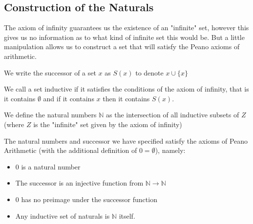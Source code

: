 \documentclass[]{article}
\begin{document}
\subsection{Construction of the Naturals}

	The axiom of infinity guarantees us the existence of an "infinite" set, however this gives us no information as to what kind of infinite set this would be. But a little manipulation allows us to construct a set that will satisfy the Peano axioms of arithmetic.

	\begin{defi} [Successor]
		We write the successor of a set $x$ as $S(x)$ to denote $x \cup \{x\}$
	\end{defi}
	
	\begin{defi} 
		We call a set inductive if it satisfies the conditions of the axiom of infinity, that is it contains $\emptyset$ and if it contains $x$ then it contains $S(x)$. 
	\end{defi}

	\begin{defi} 
			We define the natural numbers $\mathbb{N}$ as the intersection of all inductive subsets of $Z$ (where $Z$ is the "infinite" set given by the axiom of infinity)
	\end{defi}

	\begin{thm}  \label{thm:peano}
			The natural numbers and successor we have specified satisfy the axioms of Peano Arithmetic (with the additional definition of $0 = \emptyset$), namely:
			\begin{itemize}
					\item $0$ is a natural number	
					\item The successor is an injective function from $\mathbb{N} \to \mathbb{N}$ 
					\item $0$ has no preimage under the successor function
					\item Any inductive set of naturals is $\mathbb{N}$ itself.
			\end{itemize}
	\end{thm}
\end{document}
